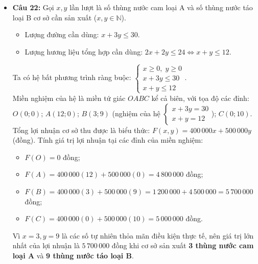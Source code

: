 \documentclass[12pt,a4paper]{article}
\begin{document}
\begin{itemize}[leftmargin=0.6cm, itemsep=1.5pt, topsep=1pt]
    \item \textbf{Câu 22:}
    Gọi $x, y$ lần lượt là số thùng nước cam loại A và số thùng nước táo loại B cơ sở cần sản xuất ($x, y \in \mathbb{N}$).
    \begin{itemize}[itemsep=0.5pt]
        \item Lượng đường cần dùng: $x + 3y \le 30$.
        \item Lượng hương liệu tổng hợp cần dùng: $2x + 2y \le 24 \iff x + y \le 12$.
    \end{itemize}
    Ta có hệ bất phương trình ràng buộc:
    $\begin{cases} x \ge 0,\; y \ge 0 \\ x + 3y \le 30 \\ x + y \le 12 \end{cases}$.\\
    Miền nghiệm của hệ là miền tứ giác $OABC$ kể cả biên, với tọa độ các đỉnh:
    $O(0; 0)$; $A(12; 0)$; $B(3; 9)$ (nghiệm của hệ $\begin{cases} x + 3y = 30 \\ x + y = 12 \end{cases}$); $C(0; 10)$.\\
    Tổng lợi nhuận cơ sở thu được là biểu thức: $F(x, y) = 400\,000x + 500\,000y$ (đồng).
    Tính giá trị lợi nhuận tại các đỉnh của miền nghiệm:
    \begin{itemize}[itemsep=0.5pt]
        \item $F(O) = 0$ đồng;
        \item $F(A) = 400\,000(12) + 500\,000(0) = 4\,800\,000$ đồng;
        \item $F(B) = 400\,000(3) + 500\,000(9) = 1\,200\,000 + 4\,500\,000 = 5\,700\,000$ đồng;
        \item $F(C) = 400\,000(0) + 500\,000(10) = 5\,000\,000$ đồng.
    \end{itemize}
    Vì $x = 3, y = 9$ là các số tự nhiên thỏa mãn điều kiện thực tế, nên giá trị lớn nhất của lợi nhuận là $5\,700\,000$ đồng khi cơ sở sản xuất \textbf{3 thùng nước cam loại A} và \textbf{9 thùng nước táo loại B}.
\end{itemize}
\end{document}

